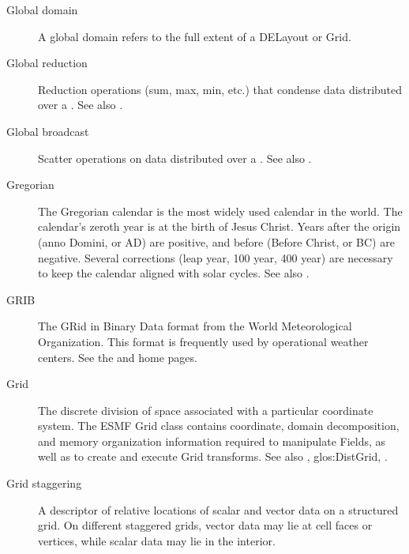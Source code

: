 \begin{description}
\label{glos:GlobDomain}
\item[Global domain] 
  A global domain refers to the full extent of a DELayout or Grid.

\label{glos:GlobReduction} 
\item[Global reduction] 
  Reduction operations (sum, max, min, etc.) that condense data distributed
  over a .
  See also .

\label{glos:GlobBroadcast}
\item[Global broadcast] 
  Scatter operations on data distributed over a 
  .
  See also .

\label{glos:Gregorian calendar}
\item[Gregorian]
  The Gregorian calendar is the most widely used calendar
in the world.  The calendar's zeroth year is at the
birth of Jesus Christ.  Years after the origin (anno Domini,
or AD) are positive, and before (Before Christ, or BC) are
negative.  Several corrections (leap year, 100 year, 400 year) 
are necessary to keep the calendar aligned with solar cycles.
  See also .

\label{glos:GRIB}
\item[GRIB]
  The GRid in Binary Data format from the World Meteorological Organization.
This format is frequently used by operational weather centers.  See the
 and
 home pages.

\label{glos:Grid} 
\item[Grid] 
  The discrete division of space associated with
  a particular coordinate system.  The ESMF Grid class contains 
  coordinate, domain decomposition, and memory 
  organization information required to manipulate 
  Fields, as well as to create and execute Grid transforms. 
  See also , 
  {glos:DistGrid}, .

\label{glos:GridStagger} 
\item[Grid staggering] 
  A descriptor of relative locations
  of scalar and vector data on a structured grid. On different
  staggered grids, vector data may lie at cell faces or vertices,
  while scalar data may lie in the interior. 


\end{description}
